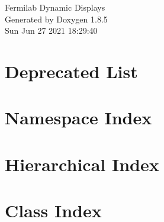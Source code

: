 \documentclass[twoside]{book}
\newcommand{\clearemptydoublepage}{%
  \newpage{\pagestyle{empty}\cleardoublepage}%
}
\begin{document}
\hypersetup{pageanchor=false}
\begin{titlepage}
\vspace*{7cm}
\begin{center}%
{\Large Fermilab Dynamic Displays }\\
\vspace*{1cm}
{\large Generated by Doxygen 1.8.5}\\
\vspace*{0.5cm}
{\small Sun Jun 27 2021 18:29:40}\\
\end{center}
\end{titlepage}
\clearemptydoublepage
\tableofcontents
\clearemptydoublepage
{}
\hypersetup{pageanchor=true}

\chapter{Deprecated List}
\label{deprecated}
\hypertarget{deprecated}{}

\chapter{Namespace Index}

\chapter{Hierarchical Index}

\chapter{Class Index}

\end{document}
